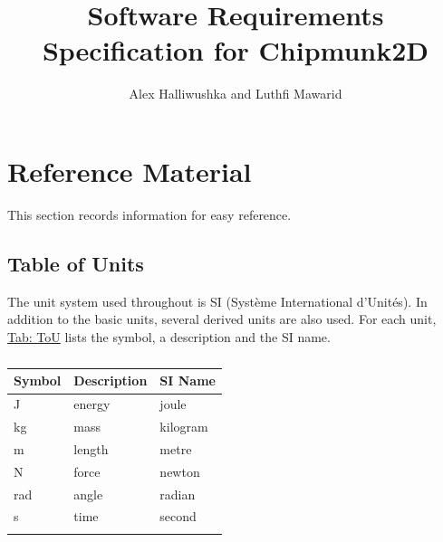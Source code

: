 \documentclass[12pt]{article}
\title{Software Requirements Specification for Chipmunk2D}
\author{Alex Halliwushka and Luthfi Mawarid}
\begin{document}
\maketitle
\tableofcontents
\newpage
\section{Reference Material}
\label{Sec:RefMat}
This section records information for easy reference.
\subsection{Table of Units}
\label{Sec:ToU}
The unit system used throughout is SI (Système International d'Unités). In addition to the basic units, several derived units are also used. For each unit, \hyperref[Table:ToU]{Tab: ToU} lists the symbol, a description and the SI name.
\begin{longtable}{l l l}
\toprule
\textbf{Symbol} & \textbf{Description} & \textbf{SI Name}
\\
\midrule
\endhead
J & energy & joule
\\
kg & mass & kilogram
\\
m & length & metre
\\
N & force & newton
\\
rad & angle & radian
\\
s & time & second
\\
\bottomrule
\caption{}
\label{Table:ToU}
\end{longtable}
\end{document}
